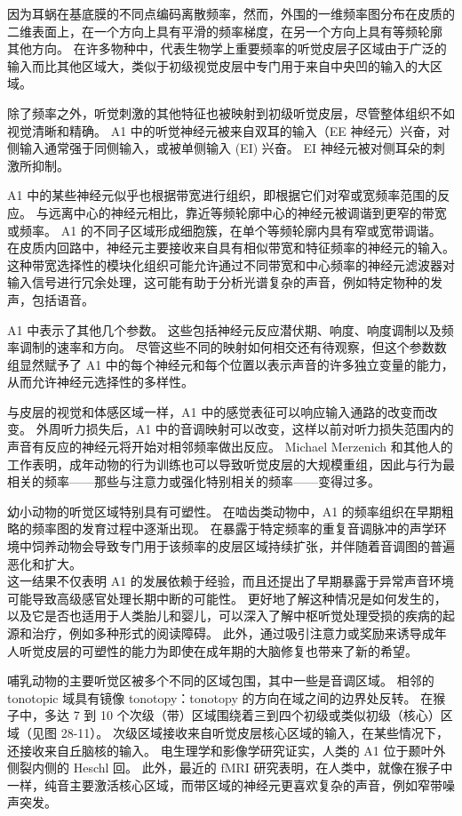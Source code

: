 因为耳蜗在基底膜的不同点编码离散频率，然而，外围的一维频率图分布在皮质的二维表面上，在一个方向上具有平滑的频率梯度，在另一个方向上具有等频轮廓 其他方向。 
在许多物种中，代表生物学上重要频率的听觉皮层子区域由于广泛的输入而比其他区域大，类似于初级视觉皮层中专门用于来自中央凹的输入的大区域。

除了频率之外，听觉刺激的其他特征也被映射到初级听觉皮层，尽管整体组织不如视觉清晰和精确。 
A1 中的听觉神经元被来自双耳的输入（EE 神经元）兴奋，对侧输入通常强于同侧输入，或被单侧输入 (EI) 兴奋。 
EI 神经元被对侧耳朵的刺激所抑制。

A1 中的某些神经元似乎也根据带宽进行组织，即根据它们对窄或宽频率范围的反应。 
与远离中心的神经元相比，靠近等频轮廓中心的神经元被调谐到更窄的带宽或频率。 
A1 的不同子区域形成细胞簇，在单个等频轮廓内具有窄或宽带调谐。 
在皮质内回路中，神经元主要接收来自具有相似带宽和特征频率的神经元的输入。 
这种带宽选择性的模块化组织可能允许通过不同带宽和中心频率的神经元滤波器对输入信号进行冗余处理，这可能有助于分析光谱复杂的声音，例如特定物种的发声，包括语音。

A1 中表示了其他几个参数。 
这些包括神经元反应潜伏期、响度、响度调制以及频率调制的速率和方向。 
尽管这些不同的映射如何相交还有待观察，但这个参数数组显然赋予了 A1 中的每个神经元和每个位置以表示声音的许多独立变量的能力，从而允许神经元选择性的多样性。

与皮层的视觉和体感区域一样，A1 中的感觉表征可以响应输入通路的改变而改变。 
外周听力损失后，A1 中的音调映射可以改变，这样以前对听力损失范围内的声音有反应的神经元将开始对相邻频率做出反应。 
Michael Merzenich 和其他人的工作表明，成年动物的行为训练也可以导致听觉皮层的大规模重组，因此与行为最相关的频率——那些与注意力或强化特别相关的频率——变得过多。

幼小动物的听觉区域特别具有可塑性。 
在啮齿类动物中，A1 的频率组织在早期粗略的频率图的发育过程中逐渐出现。 
在暴露于特定频率的重复音调脉冲的声学环境中饲养动物会导致专门用于该频率的皮层区域持续扩张，并伴随着音调图的普遍恶化和扩大。 \\
这一结果不仅表明 A1 的发展依赖于经验，而且还提出了早期暴露于异常声音环境可能导致高级感官处理长期中断的可能性。 
更好地了解这种情况是如何发生的，以及它是否也适用于人类胎儿和婴儿，可以深入了解中枢听觉处理受损的疾病的起源和治疗，例如多种形式的阅读障碍。 
此外，通过吸引注意力或奖励来诱导成年人听觉皮层的可塑性的能力为即使在成年期的大脑修复也带来了新的希望。

哺乳动物的主要听觉区被多个不同的区域包围，其中一些是音调区域。 
相邻的 tonotopic 域具有镜像 tonotopy：tonotopy 的方向在域之间的边界处反转。 
在猴子中，多达 7 到 10 个次级（带）区域围绕着三到四个初级或类似初级（核心）区域（见图 28-11）。 
次级区域接收来自听觉皮层核心区域的输入，在某些情况下，还接收来自丘脑核的输入。 
电生理学和影像学研究证实，人类的 A1 位于颞叶外侧裂内侧的 Heschl 回。 
此外，最近的 fMRI 研究表明，在人类中，就像在猴子中一样，纯音主要激活核心区域，而带区域的神经元更喜欢复杂的声音，例如窄带噪声突发。


